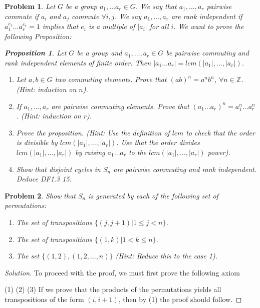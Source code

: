 \documentclass[11 pt]{article}
\newtheorem{Prob}{Problem}
\newtheorem{Prop}{Proposition}
\theoremstyle{definition}
\theoremstyle{remark}
\newenvironment{solution}
  {\renewcommand\qedsymbol{$\blacksquare$}\begin{proof}[Solution]}
  {\end{proof}}
\begin{document}
\begin{Prob}
	Let $G$ be a group $a_1,\dots a_r\in G$. We say that $a_1, \dots, a_r$ pairwise commute if $a_i$ and $a_j$ commute $\forall i,j$. We say $a_1,\dots, a_r$ are rank independent if $a_1^{e_1}\dots a_r^{e_r}=1$ implies that $e_i$ is a multiple of $|a_i|$ for all $i$. We want to prove the following Proposition:
	\begin{Prop}
		Let $G$ be a group and $a_1,\dots, a_r\in G$ be pairwise commuting and rank independent elements of finite order. Then $|a_1\dots a_r|=lcm(|a_1|,\dots, |a_r|)$.
	\end{Prop}
\begin{enumerate}
	\item Let $a,b\in G$ two commuting elements. Prove that $(ab)^n=a^nb^n$, $\forall n\in\mathbb{Z}$. (Hint: induction on $n$).
	\item If $a_1,\dots, a_r$ are pairwise commuting elements. Prove that $(a_1\dots a_r)^n=a_1^n\dots a_r^n$. (Hint: induction on $r$).
	\item Prove the proposition. (Hint: Use the definition of $lcm$ to check that the order is divisible by $lcm(|a_1|,\dots, |a_r|)$. Use that the order divides $lcm(|a_1|,\dots, |a_r|)$ by raising $a_1\dots a_r$ to the $lcm(|a_1|,\dots, |a_r|)$ power).
	\item Show that disjoint cycles in $S_n$ are pairwise commuting and rank independent. Deduce DF1.3 15.
\end{enumerate}
\end{Prob}

\begin{Prob}
	Show that $S_n$ is generated by each of the following set of permutations:
	\begin{enumerate}
		\item The set of transpositions $\{(j, j+1)|1\leq j<n\}$.
		\item The set of transpositions $\{(1,k)|1<k\leq n\}$.
		\item The set $\{(1,2),(1,2,\dots,n)\}$ (Hint: Reduce this to the case 1).
	\end{enumerate}
\end{Prob}

\begin{solution}
To proceed with the proof, we must first prove the following axiom

(1) 
(2)
(3) If we prove that the products of the permutations yields all transpositions of the form $(i,i+1)$, then by (1) the proof should follow.
\end{solution}

\end{document}
